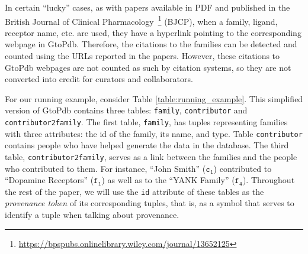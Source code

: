 \documentclass[preprint,12pt,sort&compress]{elsarticle}
\newcommand{\scream}[1]{{\bf * #1 *}{\typeout{#1}}}
\begin{document}
In certain ``lucky'' cases, as with papers available in PDF and published in the British Journal of Clinical Pharmacology~\footnote{\url{https://bpspubs.onlinelibrary.wiley.com/journal/13652125}} (BJCP), when a  family, ligand, receptor name, etc. are used, they have a hyperlink pointing to the corresponding webpage in GtoPdb. Therefore, the citations to the families can be detected and counted using the URLs reported in the papers.
However, these citations to GtoPdb webpages are not counted as such by citation systems, so they are not converted into credit for curators and collaborators. 

For our running example, consider Table \ref{table:running_example}. This simplified version of GtoPdb contains three tables: \texttt{family}, \texttt{contributor} and \texttt{contributor2family}.
The first table, \texttt{family}, has tuples representing families with three attributes: the id of the family, its name, and type. 
Table \texttt{contributor} contains people who have helped generate the data in the database.
The third table, \texttt{contributor2family}, serves as a link between the families and the people who contributed to them.
For instance, ``John Smith'' ($\mathtt{c_1}$) contributed to ``Dopamine Receptors'' ($\mathtt{f_1}$) as well as to the ``YANK Family'' ($\mathtt{f_4}$). Throughout the rest of the paper, we will use the \texttt{id} attribute of these tables as the \emph{provenance token} of its corresponding tuples, that is, as a symbol that serves to identify a tuple when talking about provenance.
\end{document}
